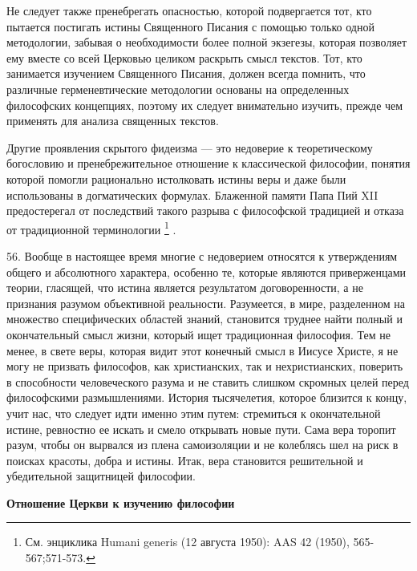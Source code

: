 \documentclass[a5paper,10pt]{article}
\begin{document}
Не следует также пренебрегать опасностью, которой подвергается тот, кто
пытается постигать истины Священного Писания с помощью только одной
методологии, забывая о необходимости более полной экзегезы, которая позволяет
ему вместе со всей Церковью целиком раскрыть смысл текстов. Тот, кто занимается
изучением Священного Писания, должен всегда помнить, что различные
герменевтические методологии основаны на определенных философских концепциях,
поэтому их следует внимательно изучить, прежде чем применять для анализа
священных текстов.

Другие проявления скрытого фидеизма — это недоверие к теоретическому богословию
и пренебрежительное отношение к классической философии, понятия которой помогли
рационально истолковать истины веры и даже были использованы в догматических
формулах. Блаженной памяти Папа Пий XII предостерегал от последствий такого
разрыва с философской традицией и отказа от традиционной терминологии
\footnote{См. энциклика Humani generis (12 августа 1950): AAS 42 (1950),
565-567;571-573.} .

56. Вообще в настоящее время многие с недоверием относятся к утверждениям
общего и абсолютного характера, особенно те, которые являются приверженцами
теории, гласящей, что истина является результатом договоренности, а не
признания разумом объективной реальности. Разумеется, в мире, разделенном на
множество специфических областей знаний, становится труднее найти полный и
окончательный смысл жизни, который ищет традиционная философия. Тем не менее, в
свете веры, которая видит этот конечный смысл в Иисусе Христе, я не могу не
призвать философов, как христианских, так и нехристианских, поверить в
способности человеческого разума и не ставить слишком скромных целей перед
философскими размышлениями. История тысячелетия, которое близится к концу, учит
нас, что следует идти именно этим путем: стремиться к окончательной истине,
ревностно ее искать и смело открывать новые пути. Сама вера торопит разум,
чтобы он вырвался из плена самоизоляции и не колеблясь шел на риск в поисках
красоты, добра и истины.  Итак, вера становится решительной и убедительной
защитницей философии.

\textbf{Отношение Церкви к изучению философии}
\end{document}
